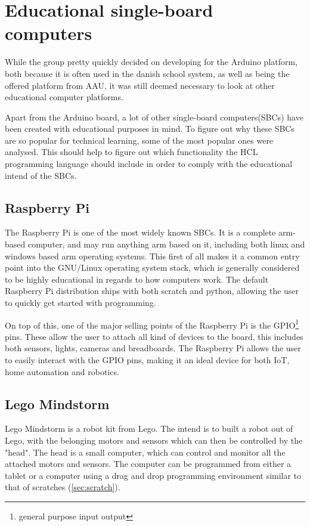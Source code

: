 \section{Educational single-board computers}
While the group pretty quickly decided on developing for the Arduino platform, both because it is often used in the danish school system, as well as being the offered platform from AAU, it was still deemed necessary to look at other educational computer platforms. 

Apart from the Arduino board, a lot of other single-board computers(SBCs) have been created with educational purposes in mind.
To figure out why these SBCs are so popular for technical learning, some of the most popular ones were analysed.
This should help to figure out which functionality the HCL programming language should include in order to comply with the educational intend of the SBCs.\cite{SBC}

\subsection{Raspberry Pi}
The Raspberry Pi is one of the most widely known SBCs. 
It is a complete arm-based computer, and may run anything arm based on it, including both linux and windows based arm operating systems. 
This first of all makes it a common entry point into the GNU/Linux operating system stack, which is generally considered to be highly educational in regards to how computers work.
The default Raspberry Pi distribution ships with both scratch and python, allowing the user to quickly get started with programming.\cite{RaspberryPi}

On top of this, one of the major selling points of the Raspberry Pi is the GPIO\footnote{general purpose input output} pins. 
These allow the user to attach all kind of devices to the board, this includes both sensors, lights, cameras and breadboards. 
The Raspberry Pi allows the user to easily interact with the GPIO pins, making it an ideal device for both IoT, home automation and robotics.\cite{RaspberryPi}

\subsection{Lego Mindstorm}
Lego Mindstorm is a robot kit from Lego. 
The intend is to built a robot out of Lego, with the belonging motors and sensors which can then be controlled by the "head". 
The head is a small computer, which can control and monitor all the attached motors and sensors. 
The computer can be programmed from either a tablet or a computer using a drag and drop programming environment similar to that of scratches (\ref{sec:scratch}). \cite{LegoMindstorms}

